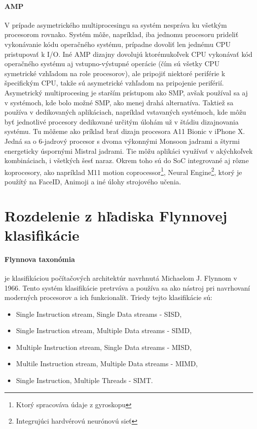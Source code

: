 \documentclass[11pt,a4paper]{report}
\begin{document}
\paragraph{AMP} V prípade asymetrického multiprocesingu sa systém nespráva ku všetkým procesorom rovnako. Systém môže, napríklad, iba jednomu procesoru prideliť vykonávanie kódu operačného systému, prípadne dovoliť len jednému CPU pristupovať k I/O. Iné AMP dizajny dovolujú ktorémukoľvek CPU vykonávať kód operačného systému aj vstupno-výstupné operácie (čím sú všetky CPU symetrické vzhľadom na role procesorov), ale pripojiť niektoré periférie k špecifickým CPU, takže sú asymetrické vzhľadom na pripojenie periférií. Asymetrický multiprocesing je starším prístupom ako SMP, avšak používal sa aj v systémoch, kde bolo možné SMP, ako menej drahá alternatíva. Taktiež sa používa v dedikovaných aplikáciach, napríklad vstavaných systémoch, kde môžu byť jednotlivé procesory dedikované určitým úlohám už v štádiu dizajnovania systému. Tu môžeme ako príklad brať dizajn procesora A11 Bionic v iPhone X. Jedná sa o 6-jadrový procesor s dvoma výkonnými Monsoon jadrami a štyrmi energeticky úspornými Mistral jadrami. Tie môžu aplikáci využívať v akýchkoľvek kombináciach, i všetkých šesť naraz. Okrem toho sú do SoC integrované aj rôzne koprocesory, ako napríklad M11 motion coprocessor\footnote{Ktorý spracováva údaje z gyroskopu}, Neural Engine\footnote{Integrujúci hardvérovú neurónovú sieť}, ktorý je použítý na FaceID, Animoji a iné úlohy strojového učenia.

\section{Rozdelenie z hľadiska Flynnovej klasifikácie}
\paragraph{Flynnova taxonómia} je klasifikáciou počítačových architektúr navrhnutá Michaelom J. Flynnom v 1966. Tento systém klasifikácie pretrváva a používa sa ako nástroj pri navrhovaní moderných procesorov a ich funkcionalít. Triedy tejto klasifikácie sú: \begin{itemize}
\item Single Instruction stream, Single Data streams - SISD,
\item Single Instruction stream, Multiple Data streams - SIMD,
\item Multiple Instruction stream, Single Data streams - MISD,
\item Multile Instruction stream, Multiple Data streams - MIMD,
\item Single Instruction, Multiple Threads - SIMT.
\end{itemize}
\end{document}
